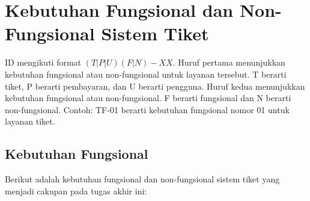 \section{Kebutuhan Fungsional dan Non-Fungsional Sistem Tiket}

ID mengikuti format \((T|P|U)(F|N)-XX\). Huruf pertama menunjukkan kebutuhan fungsional atau non-fungsional untuk layanan tersebut. T berarti tiket, P berarti pembayaran, dan U berarti pengguna. Huruf kedua menunjukkan kebutuhan fungsional atau non-fungsional. F berarti fungsional dan N berarti non-fungsional. Contoh: TF-01 berarti kebutuhan fungsional nomor 01 untuk layanan tiket.

\subsection{Kebutuhan Fungsional}

Berikut adalah kebutuhan fungsional dan non-fungsional sistem tiket yang menjadi cakupan pada tugas akhir ini:

